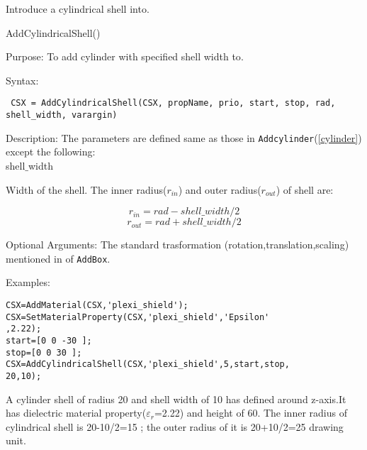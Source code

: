 Introduce a cylindrical shell into\hyperref[CSX]{}. 

\begin{FontNameFunct}{AddCylindricalShell()}
\end{FontNameFunct}


\begin{FontDescr}{Purpose:}
To add cylinder with specified shell width to\hyperref[CSX]{}. 
\end{FontDescr}

\begin{FontDescr}{Syntax:}
\begin{lstlisting} 
 CSX = AddCylindricalShell(CSX, propName, prio, start, stop, rad, shell_width, varargin)
\end{lstlisting}
\end{FontDescr}

\begin{FontDescr}{Description:}
The parameters are defined same as those in \texttt{Addcylinder}(\ref{cylinder}) except the following: \\
\textcolor{varcol}{shell$\_$width}
\begin{myindentpar} Width of the shell. The inner radius($r_{in}$) and outer radius($r_{out}$) of shell are:

\begin{equation}    
r_{in}=rad-shell\_width/2 
\end{equation}
\label{rin}
\begin{equation}
r_{out}=rad+shell\_width/2 
\end{equation}
\label{rout}

\end{myindentpar} 

\end{FontDescr}

\begin{FontDescr}{Optional Arguments:}
The standard trasformation (rotation,translation,scaling) mentioned in  \hyperref[prim_transform]{} of \texttt{AddBox}.   
\end{FontDescr}

\begin{FontDescr}{Examples:}

\begin{lstlisting} 
CSX=AddMaterial(CSX,'plexi_shield');
CSX=SetMaterialProperty(CSX,'plexi_shield','Epsilon'
,2.22);
start=[0 0 -30 ];
stop=[0 0 30 ];
CSX=AddCylindricalShell(CSX,'plexi_shield',5,start,stop,
20,10);
\end{lstlisting}
A cylinder shell of radius 20 and shell width of 10 has defined around z-axis.It has dielectric material property($\varepsilon_{r}$=2.22) and height of 60. The inner radius of cylindrical shell is 20-10/2=15 ; the outer radius of it is 20+10/2=25 drawing unit.    
\end{FontDescr}

